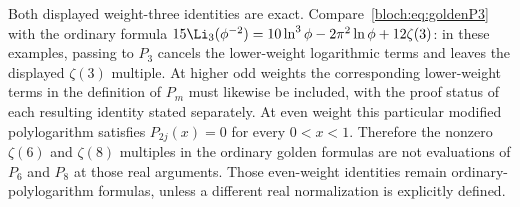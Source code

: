 
Both displayed weight-three identities are exact.
Compare~\eqref{bloch:eq:goldenP3} with the ordinary formula
$15\Li_3(\phi^{-2})=10\ln^3\phi-2\pi^2\ln\phi+12\zeta(3)$:
in these examples, passing to $P_3$ cancels the lower-weight
logarithmic terms and leaves the displayed $\zeta(3)$ multiple.
At higher odd weights the corresponding lower-weight terms in the
definition of $P_m$ must likewise be included, with the proof status
of each resulting identity stated separately.  At even weight this
particular modified polylogarithm satisfies
$P_{2j}(x)=0$ for every $0<x<1$.  Therefore the nonzero
$\zeta(6)$ and $\zeta(8)$ multiples in the ordinary golden formulas
are not evaluations of $P_6$ and $P_8$ at those real arguments.
Those even-weight identities remain ordinary-polylogarithm formulas,
unless a different real normalization is explicitly defined.
